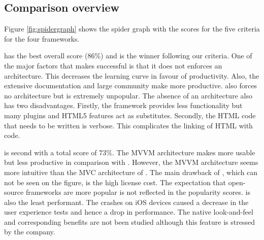 \documentclass[a4paper]{artikel3}
\begin{document}
\begin{table}
\centering
{}
\caption{User experience of scrolling through a long list.}
\label{tabel:evaluatie-performantie-gebruikerservaring}
\end{table}


\subsection{Comparison overview} %
\label{sec:evaluation-overview}

Figure \ref{fig:spidergraph} shows the spider graph with the scores for the five criteria for the four frameworks.

\jqma{} has the best overall score ($86\%$) and is the winner following our criteria.
One of the major factors that makes \jqma{} successful is that it does not enforces an architecture.
This decreases the learning curve in favour of productivity.
Also,  the extensive documentation and large community make \jqma{} more productive.
\lungo{} also forces no architecture but is extremely unpopular.
The absence of 	an architecture also has two disadvantages.
Firstly,  the framework provides less functionality but many plugins and HTML5 features act as substitutes.
Secondly,  the HTML code that needs to be written is verbose.
This complicates the linking of HTML with \js{} code.

\kendoa{} is second with a total score of $73\%$.
The MVVM architecture makes \kendoa{} more usable but less productive in comparison with \jqma{}.
However,  the MVVM architecture seems more intuitive than the MVC architecture of \sta{}.
The main drawback of \kendoa{},  which can not be seen on the figure, is the high license cost.
The expectation that open-source frameworks are more popular is not reflected in the popularity scores.
\kendoa{} is also the least performant.
The crashes on iOS devices caused a decrease in the user experience tests and hence a drop in performance.
The native look-and-feel and corresponding benefits are not been studied although this feature is stressed by the \kendoa{} company.
\end{document}
